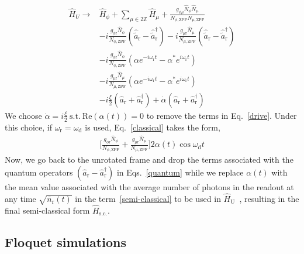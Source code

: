 \documentclass[%
reprint,
superscriptaddress,
 amsmath,amssymb,
 aps,
 prx,
longbibliography,
floatfix,
]{revtex4-2}
\begin{document}
\begin{align}
   \hat H_U \rightarrow &\hat H_\phi+\sum_{\mu\in 2\mathbb{Z}}\hat H_\mu+\frac{g_{\phi\mu}\hat N_\phi\hat N_\mu}{N_{\phi,\textrm{ZPF}}N_{\mu,\textrm{ZPF}}}\label{bare}\\ 
   &-i\frac{g_{\phi\textrm{r}}\hat N_\phi}{N_{\phi,\textrm{ZPF}}}(\hat {\tilde{a}}_\textrm{r}-\hat {\tilde{a}}_\textrm{r}^\dagger)-i\frac{g_{\mu\textrm{r}}\hat N_\mu}{N_{\mu,\textrm{ZPF}}}(\hat {\tilde{a}}_\textrm{r}-\hat {\tilde{a}}_\textrm{r}^\dagger)\label{quantum}\\
   &-i\frac{g_{\phi\textrm{r}}\hat N_\phi}{N_{\phi,\textrm{ZPF}}}(\alpha e^{-i\omega_\textrm{r} t}-\alpha^* e^{i\omega_\textrm{r} t})\\&-i\frac{g_{\mu\textrm{r}}\hat N_\mu}{N_{\mu,\textrm{ZPF}}}(\alpha e^{-i\omega_\textrm{r} t}-\alpha^* e^{i\omega_\textrm{r} t})\label{classical}\\
   &-i\frac{\xi}{2}(\hat a_\textrm{r}+\hat a_\textrm{r}^\dagger)+\dot{\alpha}(\hat a_\textrm{r}+\hat a_\textrm{r}^\dagger)\label{drive}
\end{align}
We choose $\dot{\alpha}=i\frac{\xi}{2} \ \textrm{s.t.} \ \mathrm{Re}(\alpha(t))=0$ to remove the terms in Eq.~\ref{drive}. Under this choice, if $\omega_\mathrm{r}=\omega_\mathrm{d}$ is used, Eq.~\ref{classical} takes the form,
\begin{align}
    \Big[\frac{g_{\phi\textrm{r}}\hat N_\phi}{N_{\phi,\textrm{ZPF}}}+\frac{g_{\mu\textrm{r}}\hat N_\mu}{N_{\mu,\textrm{ZPF}}}\Big]2\alpha(t)\cos{\omega_\textrm{d} t}\label{semi-classical}
\end{align}
Now, we go back to the unrotated frame and drop the terms associated with the quantum operators $(\hat{a}_\textrm{r}-\hat{a}_\textrm{r}^\dagger)$ in Eqs.~\ref{quantum} while we replace $\alpha(t)$ with the mean value associated with the average number of photons in the readout at any time $\sqrt{\bar n_\textrm{r}(t)}$ in the term~\ref{semi-classical} to be used in $\hat H_\textrm{U}$~\cite{cohen2023reminiscence}, resulting in the final semi-classical form $\hat H_\textrm{s.c.}$.

\subsection{Floquet simulations}
\end{document}
